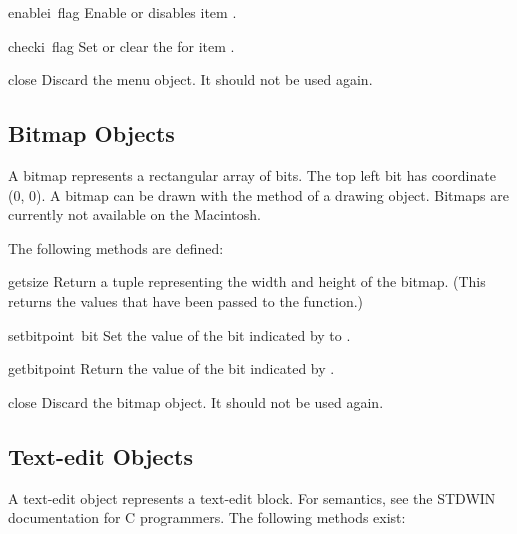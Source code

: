 \begin{funcdesc}{enable}{i\, flag}
Enable or disables item
.
\end{funcdesc}

\begin{funcdesc}{check}{i\, flag}
Set or clear the
for item
.
\end{funcdesc}

\begin{funcdesc}{close}{}
Discard the menu object.  It should not be used again.
\end{funcdesc}

\subsection{Bitmap Objects}

A bitmap represents a rectangular array of bits.
The top left bit has coordinate (0, 0).
A bitmap can be drawn with the  method of a drawing object.
Bitmaps are currently not available on the Macintosh.

The following methods are defined:

\renewcommand{\indexsubitem}{(bitmap method)}

\begin{funcdesc}{getsize}{}
Return a tuple representing the width and height of the bitmap.
(This returns the values that have been passed to the 
function.)
\end{funcdesc}

\begin{funcdesc}{setbit}{point\, bit}
Set the value of the bit indicated by  to .
\end{funcdesc}

\begin{funcdesc}{getbit}{point}
Return the value of the bit indicated by .
\end{funcdesc}

\begin{funcdesc}{close}{}
Discard the bitmap object.  It should not be used again.
\end{funcdesc}

\subsection{Text-edit Objects}

A text-edit object represents a text-edit block.
For semantics, see the STDWIN documentation for C programmers.
The following methods exist:


